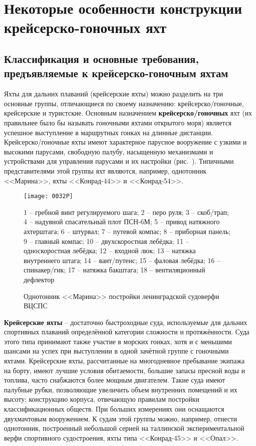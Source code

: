 \twocolumn

\chapter{Некоторые особенности конструкции крейсерско-гоночных яхт}

\section{Классификация и основные требования, предъявляемые к крейсерско-гоночным яхтам}

Яхты для дальних плаваний (крейсерские яхты) можно разделить на три
основные группы, отличающиеся по своему назначению:
крейсерско\-/гоночные, крейсерские и туристские.  Основным назначением
\textbf{крейсерско\-/гоночных} яхт (их правильнее было бы называть
гоночными яхтами открытого моря) является успешное выступление в
маршрутных гонках на длинные дистанции. Крейсерско\-/гоночные яхты
имеют характерное парусное вооружение с узкими и высокими парусами,
свободную палубу, насыщенную механизмами и устройствами для управления
парусами и их настройки (рис.~). Типичными представителями
этой группы яхт являются, например, однотонник <<Марина>>, яхты
<<Конрад-44>> и <<Конрад-54>>.

\begin{figure*}[htb]
  \centering
  \texttt{[image: 0032P]}
  \caption{Однотонник <<Марина>> постройки ленинградской судоверфи ВЦСПС}
  \label{fig:32}
  \small
  \centering{}
  1 \--- гребной винт регулируемого шага; 2 \--- перо руля; 3 \--- скоб\-/трап; 4 \--- надувной спасательный плот ПСН-6М; 5 \--- привод натяжного ахтерштага; 6 \--- штурвал; 7 \--- путевой компас; 8 \--- приборная панель; 9 \--- главный компас; 10 \--- двухскоростная лебёдка; 11 \--- односкоростная лебёдка; 12 \--- входной люк; 13 \--- натяжка внутреннего штага; 14 \--- вант\-/путенс; 15 \--- фаловая лебёдка; 16 \--- спинакер\-/гик; 17 \--- натяжка бакштага; 18 \--- вентиляционный дефлектор
\end{figure*}

\textbf{Крейсерские яхты} \--- достаточно
быстроходные суда, используемые для дальних спортивных плаваний
определённой категории сложности и протяжённости. Суда этого типа
принимают также участие в морских гонках, хотя и с меньшими шансами на
успех при выступлении в одной зачётной группе с гоночными
яхтами. Крейсерские яхты, рассчитанные на многодневное пребывание
экипажа на борту, имеют лучшие условия обитаемости, большие запасы
пресной воды и топлива, часто снабжаются более мощным
двигателем. Такие суда имеют палубные рубки, позволяющие увеличить
объем внутренних помещений и их высоту; конструкцию корпуса,
отвечающую правилам постройки классификационных обществ. При больших
измерениях они оснащаются двухмачтовым вооружением. К судам этой
группы можно, например, отнести однотонник, построенный небольшой
серией на таллинской экспериментальной верфи спортивного судостроения,
яхты типа <<Конрад-45>> и <<Опал>>.


